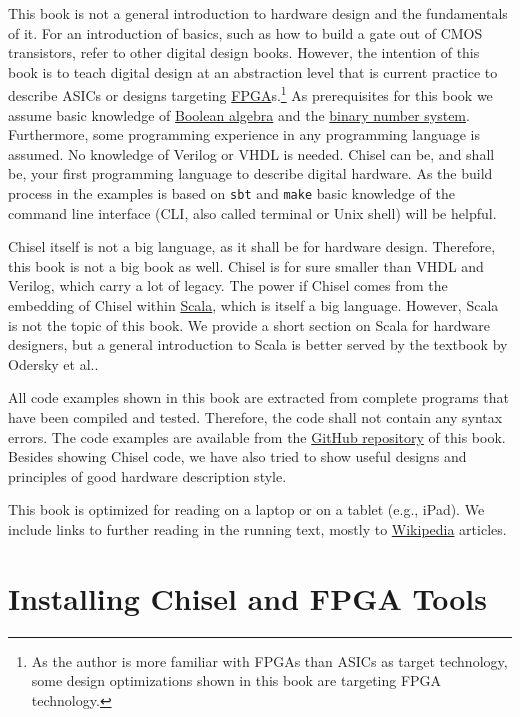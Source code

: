 \documentclass[%
    10pt, %
    headinclude, footexclude,
    openright, %
    notitlepage,
    cleardoubleempty,
    headsepline,
    pointlessnumbers,
    bibtotoc, idxtotoc,
    ]{scrbook}
\newcommand{\code}[1]{{\small{\texttt{#1}}}}
\newcommand{\myref}[2]{\href{#1}{#2}}
\begin{document}
This book is not a general introduction to hardware design and the fundamentals of it.
For an introduction of basics, such as how to build a gate out of CMOS transistors,
refer to other digital design books.
However, the intention of this book is to teach digital design at an abstraction level that is
current practice to describe ASICs or designs targeting
\myref{https://en.wikipedia.org/wiki/Field-programmable_gate_array}{FPGA}s.\footnote{As the author is more familiar with FPGAs
than ASICs as target technology, some design optimizations shown in this book are
targeting FPGA technology.}
As prerequisites for this book we assume basic knowledge of
\myref{https://en.wikipedia.org/wiki/Boolean_algebra}{Boolean algebra} and the
\myref{https://en.wikipedia.org/wiki/Binary_number}{binary number system}.
Furthermore, some programming experience in any programming language
is assumed. No knowledge of Verilog or VHDL is needed.
Chisel can be, and shall be, your first programming language to describe digital hardware.
As the build process in the examples is based on \code{sbt} and \code{make}
basic knowledge of the command line interface (CLI, also called terminal or
Unix shell) will be helpful.

Chisel itself is not a big language, as it shall be for hardware design.
Therefore, this book is not a big book as well.
Chisel is for sure smaller than VHDL and Verilog, which carry a lot of legacy.
The power if Chisel comes from the embedding of Chisel within
\myref{https://www.scala-lang.org/}{Scala}, which is itself a big language.
However, Scala is not the topic
of this book. We provide a short section on Scala for hardware designers,
but a general introduction to Scala is better served by the textbook by
Odersky et al.\cite{Scala}.

All code examples shown in this book are extracted from complete programs
that have been compiled and tested. Therefore, the code shall not contain
any syntax errors. The code examples are available from the
\myref{https://github.com/schoeberl/chisel-book}{GitHub repository}
of this book.
Besides showing Chisel code, we have also tried to show useful designs and
principles of good hardware description style.

This book is optimized for reading on a laptop or on a tablet (e.g., iPad).
We include links to further reading in the running text, mostly to
\myref{https://en.wikipedia.org/}{Wikipedia} articles.

\section{Installing Chisel and FPGA Tools}
\end{document}
